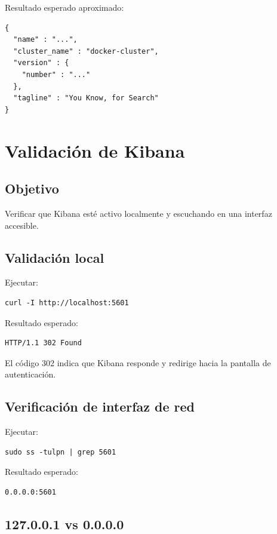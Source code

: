 \documentclass[
  coursetitle={Cómputo Nube y Tecnologías Emergentes},
  coursehours={96},
  coursedate={Verano 2026},
  doctype={Laboratorio},
  otherlangs={english,french},
  authorname={Lázaro},
  authorsurname={Bustio-Martínez},
  authortitle={PhD},
  role={Profesor Investigador},
  email={lbustio@inaoe.mx},
  phone={5559504000},
  ext={7459},
  institution={Instituto Nacional de Astrofísica, Óptica y Electrónica (INAOE)},
  department={Maestría en Ciencias en Tecnologías de Seguridad},
  address={Luis Enrique Erro 1, Sta. Ma. Tonantzintla, San Andrés Cholula, CP 72840, Puebla, México},
  margin={0.5in}
]{../../lbustio_lecture_notes}
\begin{document}
Resultado esperado aproximado:

\begin{verbatim}
{
  "name" : "...",
  "cluster_name" : "docker-cluster",
  "version" : {
    "number" : "..."
  },
  "tagline" : "You Know, for Search"
}
\end{verbatim}

\section{Validación de Kibana}

\subsection{Objetivo}

Verificar que Kibana esté activo localmente y escuchando en una interfaz accesible.

\subsection{Validación local}

Ejecutar:

\begin{lstlisting}
curl -I http://localhost:5601
\end{lstlisting}

Resultado esperado:

\begin{verbatim}
HTTP/1.1 302 Found
\end{verbatim}

El código 302 indica que Kibana responde y redirige hacia la pantalla de autenticación.

\subsection{Verificación de interfaz de red}

Ejecutar:

\begin{lstlisting}
sudo ss -tulpn | grep 5601
\end{lstlisting}

Resultado esperado:

\begin{verbatim}
0.0.0.0:5601
\end{verbatim}

\subsection{127.0.0.1 vs 0.0.0.0}
\end{document}
